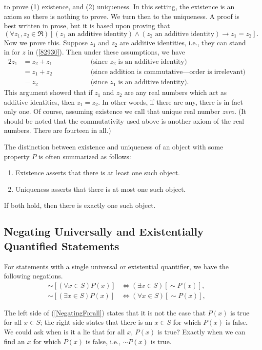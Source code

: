 to prove (1) existence, and (2) uniqueness. In this setting, the
existence is an axiom so there is nothing to prove.  We turn
then to the uniqueness.  A proof is best written in prose,
but it is based upon proving that
$$(\forall z_1,z_2\in\Re)[(z_1\text{ an additive identity}) 
\wedge (z_2\text{ an additive identity})\longrightarrow z_1=z_2].$$
Now we prove this.  Suppose $z_1$ and $z_2$ are additive
identities, i.e., they can stand in for $z$
in (\ref{82930}).  Then under these assumptions, we have
\begin{alignat*}{2}
z_1&=z_2+z_1\qquad\qquad&&\text{(since }z_2\text{ is an additive identity)}\\
   &=z_1+z_2&&\text{(since addition is commutative---order is irrelevant)}\\
   &=z_2&&\text{(since }z_1\text{ is an additive identity)}.
\end{alignat*}
This argument showed that if $z_1$ and $z_2$ are any
real numbers  which act as additive
identities, then $z_1=z_2$.  In other words, if there are
any, there is in fact only one.
Of course, assuming existence we call that unique real number {\it zero}.
(It should be noted that the commutativity used above
is another axiom of the real
numbers.  There are fourteen in all.)

The distinction between existence and uniqueness of an object
with some property $P$ is often summarized
as follows:
\begin{enumerate}[(1)]
  \item Existence asserts that there is at least one such object.
  \item Uniqueness asserts that there is at most one such object.
\end{enumerate}
If both hold, then there is exactly one such object.

\subsection{Negating Universally and Existentially Quantified Statements}
For statements with a single universal or existential quantifier,
we have the following negations.
\begin{align}
\sim[(\forall x\in S)P(x)]&\iff(\exists x\in S)[\sim P(x)],
         \label{NegatingForall}\\
\sim[(\exists x\in S)P(x)]&\iff(\forall x\in S)[\sim P(x)],
         \label{NegatingExists}
\end{align}

The left side of (\ref{NegatingForall}) states that it is not
the case that $P(x)$ is true for all $x\in S$; the 
right side states that there is an $x\in S$ for which
$P(x)$ is false.  We could ask when is it a lie that
for all $x$, $P(x)$ is true?  Exactly when we can find
an $x$ for which $P(x)$ is false, i.e., $\sim P(x)$ is true.


